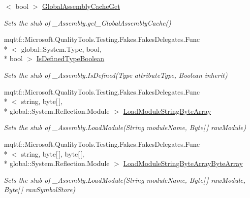 \begin{DoxyCompactItemize}
$<$ bool $>$ \hyperlink{class_system_1_1_runtime_1_1_interop_services_1_1_fakes_1_1_stub___assembly_aaa30127a2af9552ec104fdfe1cefc403}{Global\-Assembly\-Cache\-Get}
\begin{DoxyCompactList}\small\item\em Sets the stub of \-\_\-\-Assembly.\-get\-\_\-\-Global\-Assembly\-Cache()\end{DoxyCompactList}\item 
mqttf\-::\-Microsoft.\-Quality\-Tools.\-Testing.\-Fakes.\-Fakes\-Delegates.\-Func\\*
$<$ global\-::\-System.\-Type, bool, \\*
bool $>$ \hyperlink{class_system_1_1_runtime_1_1_interop_services_1_1_fakes_1_1_stub___assembly_a9fc84fc5acc362a00a740788f59ecf5d}{Is\-Defined\-Type\-Boolean}
\begin{DoxyCompactList}\small\item\em Sets the stub of \-\_\-\-Assembly.\-Is\-Defined(\-Type attribute\-Type, Boolean inherit)\end{DoxyCompactList}\item 
mqttf\-::\-Microsoft.\-Quality\-Tools.\-Testing.\-Fakes.\-Fakes\-Delegates.\-Func\\*
$<$ string, byte\mbox{[}$\,$\mbox{]}, \\*
global\-::\-System.\-Reflection.\-Module $>$ \hyperlink{class_system_1_1_runtime_1_1_interop_services_1_1_fakes_1_1_stub___assembly_aaa158f016d116f79373e0d3bb207452a}{Load\-Module\-String\-Byte\-Array}
\begin{DoxyCompactList}\small\item\em Sets the stub of \-\_\-\-Assembly.\-Load\-Module(\-String module\-Name, Byte\mbox{[}$\,$\mbox{]} raw\-Module)\end{DoxyCompactList}\item 
mqttf\-::\-Microsoft.\-Quality\-Tools.\-Testing.\-Fakes.\-Fakes\-Delegates.\-Func\\*
$<$ string, byte\mbox{[}$\,$\mbox{]}, byte\mbox{[}$\,$\mbox{]}, \\*
global\-::\-System.\-Reflection.\-Module $>$ \hyperlink{class_system_1_1_runtime_1_1_interop_services_1_1_fakes_1_1_stub___assembly_a098ab737845b12165053703010a6a194}{Load\-Module\-String\-Byte\-Array\-Byte\-Array}
\begin{DoxyCompactList}\small\item\em Sets the stub of \-\_\-\-Assembly.\-Load\-Module(\-String module\-Name, Byte\mbox{[}$\,$\mbox{]} raw\-Module, Byte\mbox{[}$\,$\mbox{]} raw\-Symbol\-Store)\end{DoxyCompactList}\item 

\end{DoxyCompactItemize}

